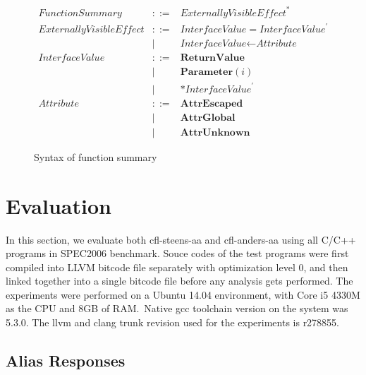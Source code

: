 \documentclass[10pt]{article}
\begin{document}
\begin{figure}[!ht]
  \begin{eqnarray*}
    \textit{FunctionSummary} & ::= & \textit{ExternallyVisibleEffect}^{*} \\
    \textit{ExternallyVisibleEffect} & ::= & \textit{InterfaceValue} = \textit{InterfaceValue}^\prime \\
                            & |   & \textit{InterfaceValue} \gets \textit{Attribute} \\
    \textit{InterfaceValue}  & ::= & \textbf{ReturnValue} \\
                    & |   & \textbf{Parameter}(i) \\
                    & |   & *\textit{InterfaceValue}^\prime \\
    \textit{Attribute}  & ::= & \textbf{AttrEscaped} \\
                    & |   & \textbf{AttrGlobal}  \\
                    & |   & \textbf{AttrUnknown}  
  \end{eqnarray*}
  \caption{Syntax of function summary\label{summary}}
\end{figure}

\section{Evaluation}\label{evaluation}

In this section, we evaluate both cfl-steens-aa and cfl-anders-aa using all
C/C++ programs in SPEC2006 benchmark. Souce codes of the test programs were first compiled
into LLVM bitcode file separately with optimization level 0, and then linked
together into a single bitcode file before any analysis gets
performed. The experiments were performed on a Ubuntu 14.04 environment, with Core i5 4330M as
the CPU and 8GB of RAM.\ Native gcc toolchain version on the system was 5.3.0.
The llvm and clang trunk revision used for the experiments is r278855.

\subsection{Alias Responses}
\end{document}
